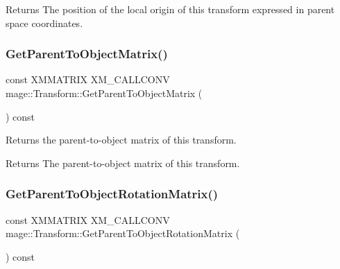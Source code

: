\begin{DoxyReturn}{Returns}
The position of the local origin of this transform expressed in parent space coordinates. 
\end{DoxyReturn}
\mbox{\label{classmage_1_1_transform_a89ea42ba5daef39d8683bb69847d275e}} 
\subsubsection{\texorpdfstring{Get\+Parent\+To\+Object\+Matrix()}{GetParentToObjectMatrix()}}
{\footnotesize\ttfamily const X\+M\+M\+A\+T\+R\+IX X\+M\+\_\+\+C\+A\+L\+L\+C\+O\+NV mage\+::\+Transform\+::\+Get\+Parent\+To\+Object\+Matrix (\begin{DoxyParamCaption}{ }\end{DoxyParamCaption}) const\hspace{0.3cm}{\ttfamily [noexcept]}}

Returns the parent-\/to-\/object matrix of this transform.

\begin{DoxyReturn}{Returns}
The parent-\/to-\/object matrix of this transform. 
\end{DoxyReturn}
\mbox{\label{classmage_1_1_transform_a95019381ff6b40edc197743ac93126c6}} 
\subsubsection{\texorpdfstring{Get\+Parent\+To\+Object\+Rotation\+Matrix()}{GetParentToObjectRotationMatrix()}}
{\footnotesize\ttfamily const X\+M\+M\+A\+T\+R\+IX X\+M\+\_\+\+C\+A\+L\+L\+C\+O\+NV mage\+::\+Transform\+::\+Get\+Parent\+To\+Object\+Rotation\+Matrix (\begin{DoxyParamCaption}{ }\end{DoxyParamCaption}) const\hspace{0.3cm}{\ttfamily [noexcept]}}

